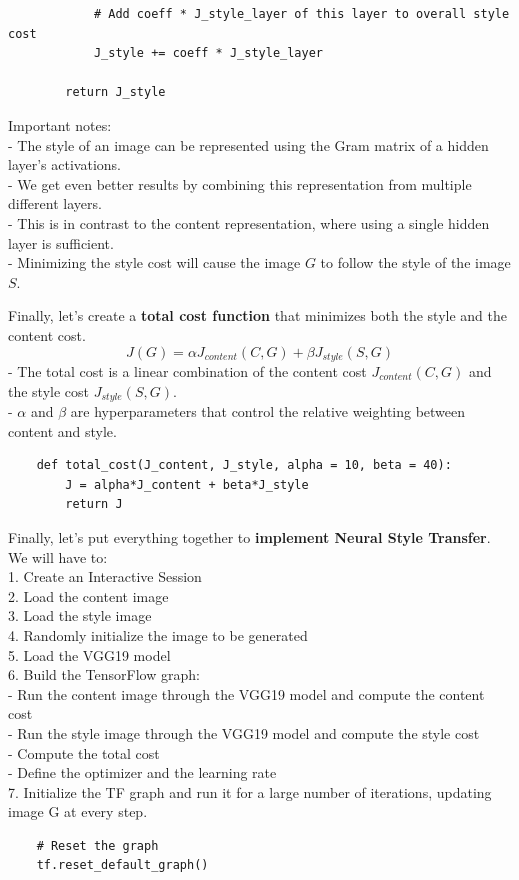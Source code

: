 \documentclass[11pt, a4paper]{article}
\begin{document}
\begin{spacing}{1.1}
\begin{lstlisting}
			# Add coeff * J_style_layer of this layer to overall style cost
			J_style += coeff * J_style_layer
		
		return J_style \end{lstlisting} \vspace*{1mm}
	Important notes: \\
	- The style of an image can be represented using the Gram matrix of a hidden layer's activations. \\
	- We get even better results by combining this representation from multiple different layers.  \\
	- This is in contrast to the content representation, where using a single hidden layer is sufficient. \\
	- Minimizing the style cost will cause the image $G$ to follow the style of the image $S$. \newpage

	\noindent Finally, let's create a \textbf{total cost function} that minimizes both the style and the content cost. 
	$$J(G) = \alpha J_{content}(C,G) + \beta J_{style}(S,G)$$
	- The total cost is a linear combination of the content cost $J_{content}(C,G)$ and the style cost $J_{style}(S,G)$. \\
	- $\alpha$ and $\beta$ are hyperparameters that control the relative weighting between content and style.
	\begin{lstlisting}
	def total_cost(J_content, J_style, alpha = 10, beta = 40):
		J = alpha*J_content + beta*J_style
		return J \end{lstlisting} \vspace*{1mm}
	Finally, let's put everything together to \textbf{implement Neural Style Transfer}. We will have to: \\
	1. Create an Interactive Session \\
	2. Load the content image  \\
	3. Load the style image \\
	4. Randomly initialize the image to be generated  \\
	5. Load the VGG19 model \\
	6. Build the TensorFlow graph: \\
	\hspace*{2mm} - Run the content image through the VGG19 model and compute the content cost \\
	\hspace*{2mm} - Run the style image through the VGG19 model and compute the style cost \\
	\hspace*{2mm} - Compute the total cost \\
	\hspace*{2mm} - Define the optimizer and the learning rate \\
	7. Initialize the TF graph and run it for a large number of iterations, updating image G at every step.
	\begin{lstlisting}
	# Reset the graph
	tf.reset_default_graph()
	

\end{lstlisting}
\end{spacing}
\end{document}
